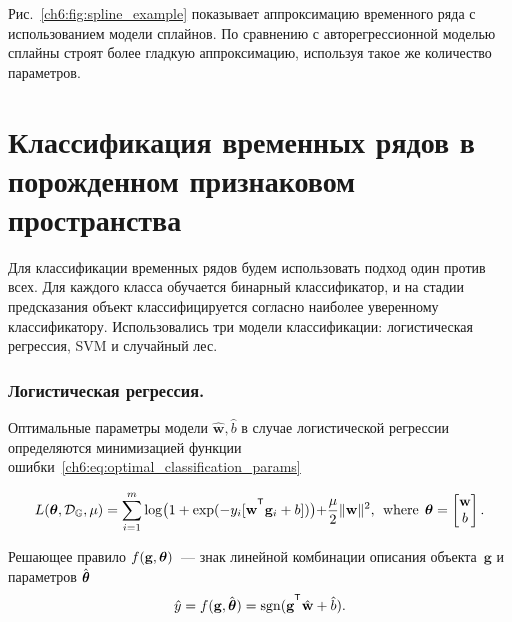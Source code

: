 Рис.~\ref{ch6:fig:spline_example} показывает аппроксимацию временного ряда с использованием модели сплайнов.
По сравнению с авторегрессионной моделью сплайны строят более гладкую аппроксимацию, используя такое же количество параметров.

\section{Классификация временных рядов в порожденном признаковом пространства}
\label{sec:ch6:feature_generation_classification}

Для классификации временных рядов будем использовать подход один против всех. 
Для каждого класса обучается бинарный классификатор, и на стадии предсказания объект классифицируется согласно наиболее уверенному классификатору.
Использовались три модели классификации: логистическая регрессия, SVM и случайный лес.

\subsubsection{Логистическая регрессия.}
Оптимальные параметры модели $\hat{\mathbf{w}}, \hat{b}$  в случае логистической регрессии определяются минимизацией функции ошибки~\eqref{ch6:eq:optimal_classification_params}

\begin{equation*}
	L(\btheta, \mathcal{D}_\mathbb{G}, \mu) = \sum_{i=1}^{m} \log\bigl(1 + \exp(-y_i [\mathbf{w}^{\T} \mathbf{g}_i + b])\bigl) + \frac{\mu}{2} \|\mathbf{w}\|^2, \:\:\mbox{where}\:\: \btheta  = \begin{bmatrix}
	\mathbf{w} \\ b
	\end{bmatrix}.
\end{equation*}

Решающее правило $f(\mathbf{g}, \boldsymbol{\theta})$~--- знак линейной комбинации описания объекта~$\mathbf{g}$ и параметров $\hat{\boldsymbol{\theta}}$
\begin{equation*}
	\hat{y} = f(\mathbf{g}, \hat{\btheta}) = \sgn(\mathbf{g}^{\T} \hat{\mathbf{w}} + \hat{b}).
\end{equation*}


